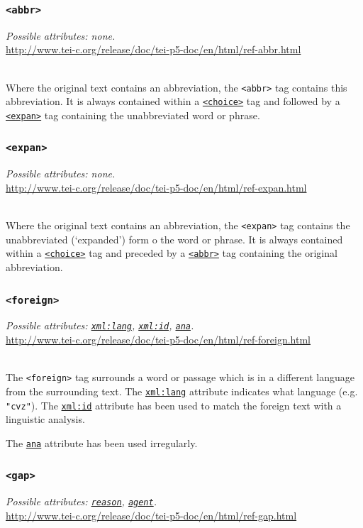 \documentclass[12pt,a4paper]{article}
\newcommand{\taglinks}[2]{
\vspace*{-0.5ex}
\hspace*{\parindent}
\begin{minipage}{\textwidth}
  \emph{Possible attributes: #1.} \\ \url{#2} \end{minipage} \vspace{0.5ex} \\ }
\begin{document}
\subsubsection{\texttt{<abbr>}} \label{tag-sec:abbr}
\taglinks{none}
{http://www.tei-c.org/release/doc/tei-p5-doc/en/html/ref-abbr.html}
Where the original text contains an abbreviation, the \texttt{<abbr>} tag contains this abbreviation.  It is always contained within a \hyperref[tag-sec:choice]{\texttt{<choice>}} tag and followed by a \hyperref[tag-sec:expan]{\texttt{<expan>}} tag containing the unabbreviated word or phrase.

\subsubsection{\texttt{<expan>}} \label{tag-sec:expan}
\taglinks{none}
{http://www.tei-c.org/release/doc/tei-p5-doc/en/html/ref-expan.html}
Where the original text contains an abbreviation, the \texttt{<expan>} tag contains the unabbreviated (`expanded') form o the word or phrase.  It is always contained within a \hyperref[tag-sec:choice]{\texttt{<choice>}} tag and preceded by a \hyperref[tag-sec:abbr]{\texttt{<abbr>}} tag containing the original abbreviation.

\subsubsection{\texttt{<foreign>}} \label{tag-sec:foreign}
\taglinks{
\hyperref[att-sec:xml:lang]{\texttt{xml:lang}}, \hyperref[att-sec:xml:id]{\texttt{xml:id}}, \hyperref[att-sec:ana]{\texttt{ana}}}
{http://www.tei-c.org/release/doc/tei-p5-doc/en/html/ref-foreign.html}
The \texttt{<foreign>} tag surrounds a word or passage which is in a different language from the surrounding text.  The \hyperref[att-sec:xml:lang]{\texttt{xml:lang}} attribute indicates what language (e.g. \texttt{"cvz"}).  The \hyperref[att-sec:xml:id]{\texttt{xml:id}} attribute has been used to match the foreign text with a linguistic analysis.

The \hyperref[att-sec:ana]{\texttt{ana}} attribute has been used irregularly.

\subsubsection{\texttt{<gap>}} \label{tag-sec:gap}
\taglinks{
\hyperref[att-sec:reason]{\texttt{reason}}, \hyperref[att-sec:agent]{\texttt{agent}}}
{http://www.tei-c.org/release/doc/tei-p5-doc/en/html/ref-gap.html}
\end{document}
